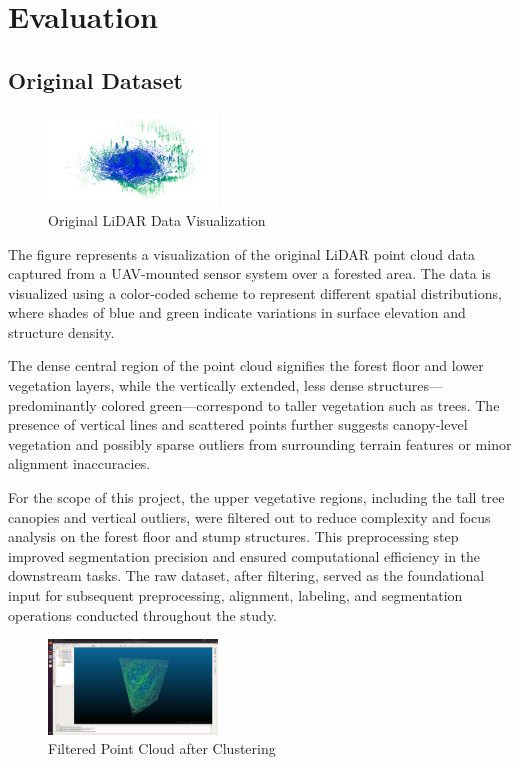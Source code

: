 \documentclass[../report.tex]{subfiles}
\begin{document}
\section{Evaluation}
\label{sec:evaluation}
    \subsection{Original Dataset}
    \begin{figure}[H]
        \centering
        \includegraphics[width=0.4\textwidth]{rnd-project-report-main/figures/Original_data.png}
        \caption{Original LiDAR Data Visualization}
    \end{figure}
    The figure represents a visualization of the original LiDAR point cloud data captured from a UAV-mounted sensor system over a forested area. The data is visualized using a color-coded scheme to represent different spatial distributions, where shades of blue and green indicate variations in surface elevation and structure density.
    
    The dense central region of the point cloud signifies the forest floor and lower vegetation layers, while the vertically extended, less dense structures—predominantly colored green—correspond to taller vegetation such as trees. The presence of vertical lines and scattered points further suggests canopy-level vegetation and possibly sparse outliers from surrounding terrain features or minor alignment inaccuracies.
    
    For the scope of this project, the upper vegetative regions, including the tall tree canopies and vertical outliers, were filtered out to reduce complexity and focus analysis on the forest floor and stump structures. This preprocessing step improved segmentation precision and ensured computational efficiency in the downstream tasks. The raw dataset, after filtering, served as the foundational input for subsequent preprocessing, alignment, labeling, and segmentation operations conducted throughout the study.
\begin{figure}[H]
    \centering
    \includegraphics[width=0.4\textwidth]{rnd-project-report-main/figures/filtered_point_cloud.png}
    \caption{Filtered Point Cloud after Clustering}
\end{figure}
\end{document}
